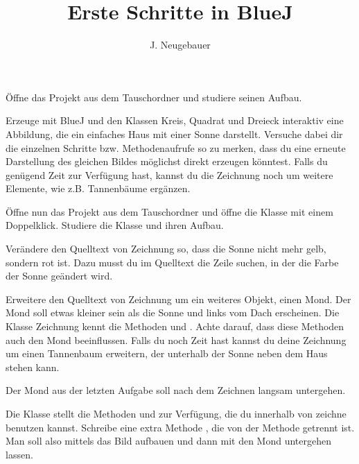 \documentclass[10pt, a4paper]{scrartcl}
\author{J. Neugebauer}
\title{Erste Schritte in BlueJ}
\date{\Heute}
\begin{document}
\ReiheTitel

\begin{aufgabe}
	Öffne das Projekt  aus dem Tauschordner und studiere seinen Aufbau.
	
	\begin{teilaufgaben}
		\teilaufgabe Erzeuge mit BlueJ und den Klassen Kreis, Quadrat und Dreieck interaktiv eine Abbildung, die ein einfaches Haus mit einer Sonne darstellt.
		\teilaufgabe Versuche dabei dir die einzelnen Schritte bzw. Methodenaufrufe so zu merken, dass du eine erneute Darstellung des gleichen Bildes möglichst direkt erzeugen könntest.
		\teilaufgabe Falls du genügend Zeit zur Verfügung hast, kannst du die Zeichnung noch um weitere Elemente, wie z.B. Tannenbäume ergänzen.
	\end{teilaufgaben}
\end{aufgabe}

\begin{aufgabe}
	Öffne nun das Projekt  aus dem Tauschordner und öffne die Klasse  mit einem Doppelklick. Studiere die Klasse und ihren Aufbau.
	
	Verändere den Quelltext von Zeichnung so, dass die Sonne nicht mehr gelb, sondern rot ist. Dazu musst du im Quelltext die Zeile suchen, in der die Farbe der Sonne geändert wird.
\end{aufgabe}

\begin{aufgabe}
	\begin{teilaufgaben}
		\teilaufgabe Erweitere den Quelltext von Zeichnung um ein weiteres Objekt, einen Mond. Der Mond soll etwas kleiner sein als die Sonne und links vom Dach erscheinen.
		\teilaufgabe Die Klasse Zeichnung kennt die Methoden  und . Achte darauf, dass diese Methoden auch den Mond beeinflussen.
		\teilaufgabe Falls du noch Zeit hast kannst du deine Zeichnung um einen Tannenbaum erweitern, der unterhalb der Sonne neben dem Haus stehen kann.
	\end{teilaufgaben}
\end{aufgabe}

\begin{aufgabe}
	Der Mond aus der letzten Aufgabe soll nach dem Zeichnen langsam untergehen.
		
	\begin{teilaufgaben}
		\teilaufgabe Die Klasse  stellt die Methoden  und  zur Verfügung, die du innerhalb von zeichne benutzen kannst.
		\teilaufgabe Schreibe eine extra Methode , die von der Methode  getrennt ist. Man soll also mittels  das Bild aufbauen und dann mit  den Mond untergehen lassen.
	\end{teilaufgaben}
\end{aufgabe}
\end{document}
